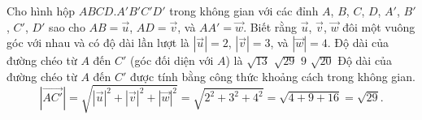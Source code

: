 \begin{ex}%
	Cho hình hộp $ABCD.A'B'C'D'$ trong không gian với các đỉnh $A$, $B$, $C$, $D$, $A'$, $B'$, $C'$, $D'$ sao cho $AB=\overrightarrow{u}$, $AD=\overrightarrow{v}$, và $AA'=\overrightarrow{w}$. Biết rằng $\overrightarrow{u}$, $\overrightarrow{v}$, $\overrightarrow{w}$ đôi một vuông góc với nhau và có độ dài lần lượt là $|\overrightarrow{u}|=2$, $|\overrightarrow{v}|=3$, và $|\overrightarrow{w}|=4$. Độ dài của đường chéo từ $A$ đến $C'$ (góc đối diện với $A$) là
	\choice
	{$\sqrt{13}$}
	{\True $\sqrt{29}$}
	{$9$}
	{$\sqrt{20}$}
	\loigiai
	{
		Độ dài của đường chéo từ $A$ đến $C'$ được tính bằng công thức khoảng cách trong không gian.
		\[\left|\overrightarrow{A C'}\right|
			=\sqrt{|\overrightarrow{u}|^2+|\overrightarrow{v}|^2+|\overrightarrow{w}|^2}
			=\sqrt{2^2+3^2+4^2}=\sqrt{4+9+16}=\sqrt{29}.\]
	}
\end{ex}


